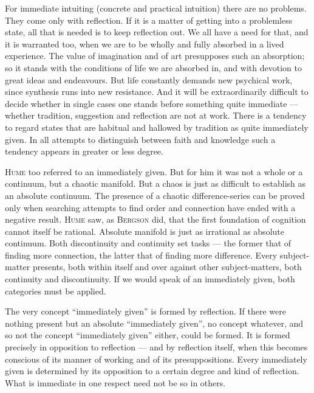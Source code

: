 \documentclass[12pt]{book}
\begin{document}
For immediate intuiting (concrete and practical intuition) there are no problems.
They come only with reflection. If it is a matter of getting into a problemless
state, all that is needed is to keep reflection out. We all have a need for that,
and it is warranted too, when we are to be wholly and fully absorbed in a lived
experience. The value of imagination and of art presupposes such an absorption;
so it stands with the conditions of life we are absorbed in, and with devotion to
great ideas and endeavours. But life constantly demands new psychical work, since
synthesis runs into new resistance. And it will be extraordinarily difficult to
decide whether in single cases one stands before something quite immediate ---
whether tradition, suggestion and reflection are not at work. There is a tendency
to regard states that are habitual and hallowed by tradition as quite immediately
given. In all attempts to distinguish between faith and knowledge such a tendency
appears in greater or less degree.

\textsc{Hume} too referred to an immediately given. But for him it was not a
whole or a continuum, but a chaotic manifold. But a chaos is just as difficult to
establish as an absolute continuum. The presence of a chaotic difference-series
can be proved only when searching attempts to find order and connection have
ended with a negative result. \textsc{Hume} saw, as \textsc{Bergson} did, that
the first foundation of cognition cannot itself be rational. Absolute manifold is
just as irrational as absolute continuum. Both discontinuity and continuity set
tasks --- the former that of finding more connection, the latter that of finding
more difference. Every subject-matter presents, both within itself and over
against other subject-matters, both continuity and discontinuity. If we would
speak of an immediately given, both categories must be applied.

The very concept ``immediately given'' is formed by reflection. If there were
nothing present but an absolute ``immediately given'', no concept whatever, and
so not the concept ``immediately given'' either, could be formed. It is formed
precisely in opposition to reflection --- and by reflection itself, when this
becomes conscious of its manner of working and of its presuppositions. Every
immediately given is determined by its opposition to a certain degree and kind of
reflection. What is immediate in one respect need not be so in others.
\end{document}
